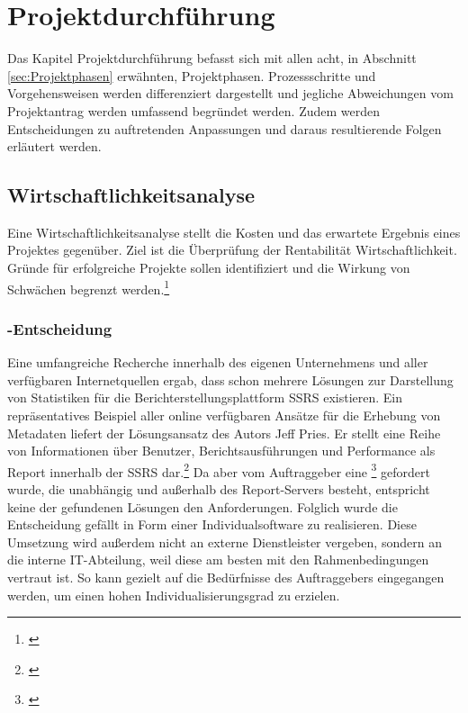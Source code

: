 \section{Projektdurchführung} 
\label{sec:Projektdurchführung}
Das Kapitel Projektdurchführung befasst sich mit allen acht, in Abschnitt \ref{sec:Projektphasen} erwähnten, Projektphasen. Prozessschritte und Vorgehensweisen werden differenziert dargestellt und jegliche Abweichungen vom Projektantrag werden umfassend begründet werden. Zudem werden Entscheidungen zu auftretenden Anpassungen und daraus resultierende Folgen erläutert werden.


\subsection{Wirtschaftlichkeitsanalyse}
\label{sec:Wirtschaftlichkeitsanalyse}
Eine Wirtschaftlichkeitsanalyse stellt die Kosten und das erwartete Ergebnis eines Projektes gegenüber. Ziel ist die Überprüfung der Rentabilität \bzw Wirtschaftlichkeit. Gründe für erfolgreiche Projekte sollen identifiziert und die Wirkung von Schwächen begrenzt werden.\footnote{\Vgl \cite{finlex:wa}}\\

\subsubsection{-Entscheidung}
\label{sec:MakeOrBuyEntscheidung}
Eine umfangreiche Recherche innerhalb des eigenen Unternehmens und aller verfügbaren Internetquellen ergab, dass schon mehrere Lösungen zur Darstellung von Statistiken für die Berichterstellungsplattform \ac{SSRS} existieren. Ein repräsentatives Beispiel aller online verfügbaren Ansätze für die Erhebung von Metadaten liefert der Lösungsansatz des Autors Jeff Pries. Er stellt eine Reihe von Informationen über Benutzer, Berichtsausführungen und Performance als Report innerhalb der \ac{SSRS} dar.\footnote{\Vgl \cite{pries:usage}} Da aber vom Auftraggeber eine \footnote{\cite{Projektantrag}} gefordert wurde, die unabhängig und außerhalb des Report-Servers besteht, entspricht keine der gefundenen Lösungen den Anforderungen. Folglich wurde die Entscheidung gefällt \projektName in Form einer Individualsoftware zu realisieren. Diese Umsetzung wird außerdem nicht an externe Dienstleister vergeben, sondern an die interne IT-Abteilung, weil diese am besten mit den Rahmenbedingungen vertraut ist. So kann gezielt auf die Bedürfnisse des Auftraggebers \teamName eingegangen werden, um einen hohen Individualisierungsgrad zu erzielen.


